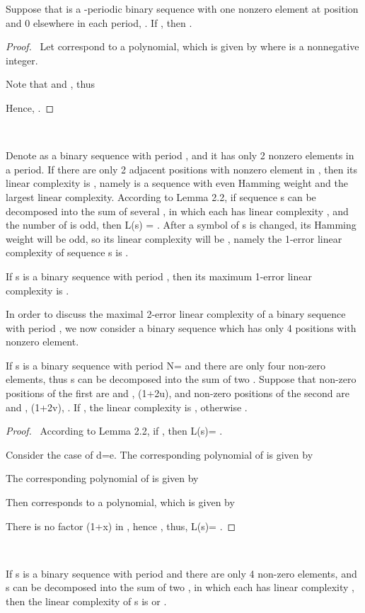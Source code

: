 \documentclass[10pt,conference,twocolumn]{IEEEtran}
\begin{document}
 Suppose that  is a -periodic
binary sequence  with one nonzero element at position  and 0
elsewhere in each period, . If , then .


\begin{proof}\
Let  correspond to a polynomial, which is given by
 where
 is a nonnegative integer.

Note that  and , thus



Hence, .
\end{proof}\

Denote  as a binary sequence with period , and it has
only 2 nonzero elements in a period. If there are only 2 adjacent
positions with nonzero element  in , then its linear
complexity is , namely  is a sequence with even
Hamming weight and the largest linear complexity. According to Lemma
2.2, if sequence s can be decomposed into the sum of several
, in which each has linear complexity  , and the
number of  is odd, then L(s) = . After a symbol of s
is changed, its Hamming weight will be odd, so its linear complexity
will be , namely the 1-error linear complexity of sequence s is
.

  If s is a binary sequence with period
, then its maximum 1-error linear complexity is .

In order to discuss the maximal 2-error linear complexity of a
binary sequence with period , we now consider a binary
sequence which has only 4 positions with nonzero element.


 If s is a binary sequence with period
N= and there are only four non-zero elements, thus s can be
decomposed into the sum of two . Suppose that non-zero
positions of the first  are  and , (1+2u),
and non-zero positions of the second  are  and ,
(1+2v), . If , the linear complexity is
, otherwise .

\begin{proof}\
According to Lemma 2.2, if , then L(s)= .

Consider the case of d=e. The corresponding polynomial of 
is given by


The corresponding polynomial of  is given by


Then  corresponds to a polynomial, which is given
by


There is no factor (1+x) in , hence
, thus, L(s)=
.
\end{proof}\


 If s is a binary sequence with period
 and there are only 4 non-zero elements, and s can be
decomposed into the sum of two , in which each has linear
complexity , then the linear complexity of s is 
or .
\end{document}
